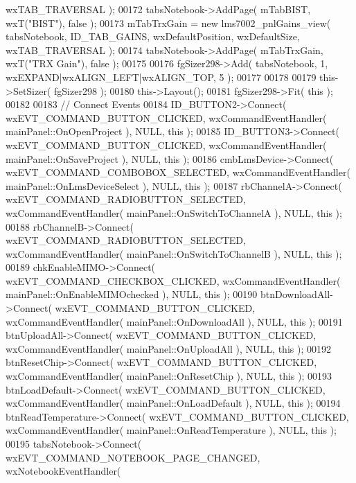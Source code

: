 \begin{DoxyCode}
      wxTAB\_TRAVERSAL );
00172     tabsNotebook->AddPage( mTabBIST, wxT(\textcolor{stringliteral}{"BIST"}), \textcolor{keyword}{false} );
00173     mTabTrxGain = \textcolor{keyword}{new} lms7002_pnlGains_view( tabsNotebook, ID_TAB_GAINS, wxDefaultPosition, wxDefaultSize, 
      wxTAB\_TRAVERSAL );
00174     tabsNotebook->AddPage( mTabTrxGain, wxT(\textcolor{stringliteral}{"TRX Gain"}), \textcolor{keyword}{false} );
00175     
00176     fgSizer298->Add( tabsNotebook, 1, wxEXPAND|wxALIGN\_LEFT|wxALIGN\_TOP, 5 );
00177     
00178     
00179     this->SetSizer( fgSizer298 );
00180     this->Layout();
00181     fgSizer298->Fit( \textcolor{keyword}{this} );
00182     
00183     \textcolor{comment}{// Connect Events}
00184     ID_BUTTON2->Connect( wxEVT\_COMMAND\_BUTTON\_CLICKED, wxCommandEventHandler( 
      mainPanel::OnOpenProject ), NULL, \textcolor{keyword}{this} );
00185     ID_BUTTON3->Connect( wxEVT\_COMMAND\_BUTTON\_CLICKED, wxCommandEventHandler( 
      mainPanel::OnSaveProject ), NULL, \textcolor{keyword}{this} );
00186     cmbLmsDevice->Connect( wxEVT\_COMMAND\_COMBOBOX\_SELECTED, wxCommandEventHandler( 
      mainPanel::OnLmsDeviceSelect ), NULL, \textcolor{keyword}{this} );
00187     rbChannelA->Connect( wxEVT\_COMMAND\_RADIOBUTTON\_SELECTED, wxCommandEventHandler( 
      mainPanel::OnSwitchToChannelA ), NULL, \textcolor{keyword}{this} );
00188     rbChannelB->Connect( wxEVT\_COMMAND\_RADIOBUTTON\_SELECTED, wxCommandEventHandler( 
      mainPanel::OnSwitchToChannelB ), NULL, \textcolor{keyword}{this} );
00189     chkEnableMIMO->Connect( wxEVT\_COMMAND\_CHECKBOX\_CLICKED, wxCommandEventHandler( 
      mainPanel::OnEnableMIMOchecked ), NULL, \textcolor{keyword}{this} );
00190     btnDownloadAll->Connect( wxEVT\_COMMAND\_BUTTON\_CLICKED, wxCommandEventHandler( 
      mainPanel::OnDownloadAll ), NULL, \textcolor{keyword}{this} );
00191     btnUploadAll->Connect( wxEVT\_COMMAND\_BUTTON\_CLICKED, wxCommandEventHandler( 
      mainPanel::OnUploadAll ), NULL, \textcolor{keyword}{this} );
00192     btnResetChip->Connect( wxEVT\_COMMAND\_BUTTON\_CLICKED, wxCommandEventHandler( 
      mainPanel::OnResetChip ), NULL, \textcolor{keyword}{this} );
00193     btnLoadDefault->Connect( wxEVT\_COMMAND\_BUTTON\_CLICKED, wxCommandEventHandler( 
      mainPanel::OnLoadDefault ), NULL, \textcolor{keyword}{this} );
00194     btnReadTemperature->Connect( wxEVT\_COMMAND\_BUTTON\_CLICKED, wxCommandEventHandler( 
      mainPanel::OnReadTemperature ), NULL, \textcolor{keyword}{this} );
00195     tabsNotebook->Connect( wxEVT\_COMMAND\_NOTEBOOK\_PAGE\_CHANGED, wxNotebookEventHandler( 

\end{DoxyCode}
